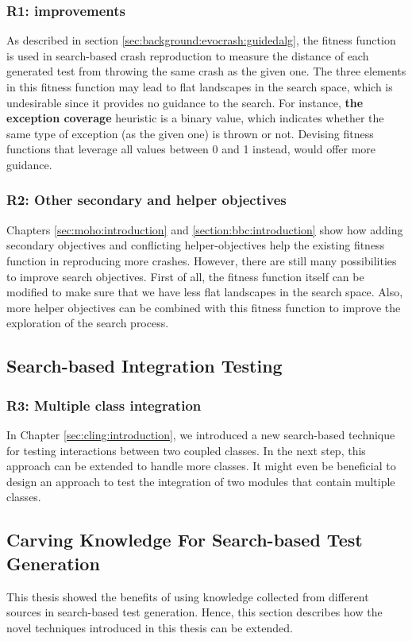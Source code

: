 \subsubsection{R1: \CrashFunction improvements}
As described in section \ref{sec:background:evocrash:guidedalg}, the \CrashFunction fitness function is used in search-based crash reproduction to measure the distance of each generated test from throwing the same crash as the given one. The three elements in this fitness function may lead to flat landscapes in the search space, which is undesirable since it provides no guidance to the search. For instance, \textbf{the exception coverage} heuristic is a binary value, which indicates whether the same type of exception (as the given one) is thrown or not. Devising fitness functions that leverage all values between 0 and 1 instead, would offer more guidance.


\subsubsection{R2: Other secondary and helper objectives}
Chapters \ref{sec:moho:introduction} and \ref{section:bbc:introduction} show how adding secondary objectives and conflicting helper-objectives help the existing \CrashFunction fitness function in reproducing more crashes. However, there are still many possibilities to improve search objectives. First of all, the \CrashFunction fitness function itself can be modified to make sure that we have less flat landscapes in the search space. Also, more helper objectives can be combined with this fitness function to improve the exploration of the search process.



\subsection{Search-based Integration Testing}
\subsubsection{R3: Multiple class integration}
In Chapter \ref{sec:cling:introduction}, we introduced a new search-based technique for testing interactions between two coupled classes. In the next step, this approach can be extended to handle more classes. It might even be beneficial to design an approach to test the integration of two modules that contain multiple classes.

\subsection{Carving Knowledge For Search-based Test Generation}
This thesis showed the benefits of using knowledge collected from different sources in search-based test generation. Hence, this section describes how the novel techniques introduced in this thesis can be extended.


